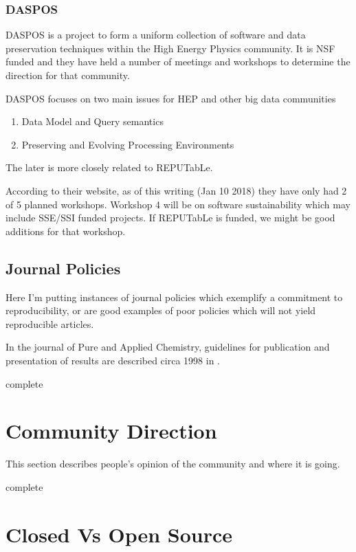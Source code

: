 \documentclass[american]{article}
\newcommand{\complete}{
	\gls{complete}
}
\begin{document}
\subsubsection{DASPOS}

DASPOS is a project to form a uniform collection of software and data preservation techniques within the High Energy Physics community. It is NSF funded and they have held a number of meetings and workshops to determine the direction for that community.

DASPOS focuses on two main issues for HEP and other big data communities

\begin{enumerate}
\item Data Model and Query semantics
\item Preserving and Evolving Processing Environments
\end{enumerate}

The later is more closely related to REPUTabLe.

According to their website, as of this writing (Jan 10 2018) they have only had 2 of 5 planned workshops. Workshop 4 will be on software sustainability which may include SSE/SSI funded projects. If REPUTabLe is funded, we might be good additions for that workshop.

\subsection{Journal Policies} \label{sec:policy-journals}

Here I'm putting instances of journal policies which exemplify a commitment to reproducibility, or are good examples of poor policies which will not yield reproducible articles.

In the journal of Pure and Applied Chemistry, guidelines for publication and presentation of results are described circa 1998 in \cite{pac-guidelines-publication-1998,pac-guidelines-presentation-1998}.

\complete

\section{Community Direction} \label{sec:community}

This section describes people's opinion of the community and where it is going.

\complete

\section{Closed Vs Open Source} \label{sec:closed-v-open}
\end{document}
